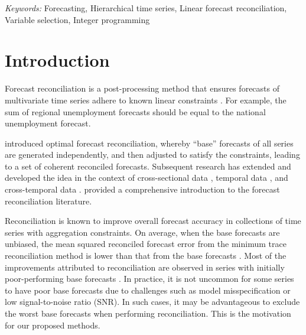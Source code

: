 \documentclass[
  11pt]{article}
\theoremstyle{plain}
\theoremstyle{remark}
\begin{document}
\noindent%
{\it Keywords:} Forecasting, Hierarchical time series, Linear forecast
reconciliation, Variable selection, Integer programming
\vfill

\newpage
\section{Introduction}\label{sec-introduction}

Forecast reconciliation is a post-processing method that ensures
forecasts of multivariate time series adhere to known linear constraints
\citep{Hyndman2011-sd}. For example, the sum of regional unemployment
forecasts should be equal to the national unemployment forecast.

\citet{Hyndman2011-sd} introduced optimal forecast reconciliation,
whereby ``base'' forecasts of all series are generated independently,
and then adjusted to satisfy the constraints, leading to a set of
coherent reconciled forecasts. Subsequent research has extended and
developed the idea in the context of cross-sectional data
\citep{Hyndman2016-cz, Wickramasuriya2019-fc, Panagiotelis2021-mf},
temporal data \citep{Athanasopoulos2017-jj}, and cross-temporal data
\citep{Di_Fonzo2023-vo}. \citet{Athanasopoulos2023-sm} provided a
comprehensive introduction to the forecast reconciliation literature.

Reconciliation is known to improve overall forecast accuracy in
collections of time series with aggregation constraints. On average,
when the base forecasts are unbiased, the mean squared reconciled
forecast error from the minimum trace reconciliation method
\citep{Wickramasuriya2019-fc} is lower than that from the base forecasts
\citep{Wickramasuriya2021-am}. Most of the improvements attributed to
reconciliation are observed in series with initially poor-performing
base forecasts \citep{Athanasopoulos2017-jj}. In practice, it is not
uncommon for some series to have poor base forecasts due to challenges
such as model misspecification or low signal-to-noise ratio (SNR). In
such cases, it may be advantageous to exclude the worst base forecasts
when performing reconciliation. This is the motivation for our proposed
methods.
\end{document}
